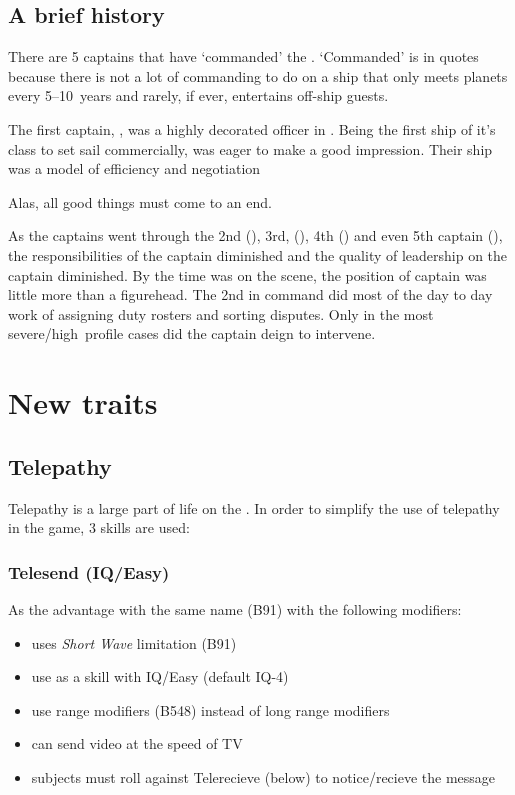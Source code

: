 \documentclass[a4paper,twocolumn]{memoir}
\begin{document}
\section{A brief history}
\label{sec:brief-history}

There are 5 captains that have `commanded' the \aventis. `Commanded' is in quotes because there is not a lot of commanding to do on a ship that only meets planets every 5--10~years and rarely, if ever, entertains off-ship guests.

The first captain, \captainone, was a highly decorated officer in \thecompany. Being the first ship of it's class to set sail commercially, \captainone was eager to make a good impression. Their ship was a model of efficiency and negotiation

Alas, all good things must come to an end.

As the captains went through the 2nd (\captaintwo), 3rd, (\captainthree), 4th (\captainfour) and even 5th captain (\captainfive), the responsibilities of the captain diminished and the quality of leadership on the captain diminished. By the time \captainfive was on the scene, the position of captain was little more than a figurehead. The 2nd in command did most of the day to day work of assigning duty rosters and sorting disputes. Only in the most severe/high~profile cases did the captain deign to intervene.



\chapter{New traits}
\label{cha:new-traits}

\section{Telepathy}
\label{sec:telepathy}

Telepathy is a large part of life on the \aventis. In order to simplify the use
of telepathy in the game, 3 skills are used:

\subsection{Telesend (IQ/Easy)}
\label{sec:telesend-iqeasy}

As the advantage with the same name (B91) with the following modifiers:
\begin{itemize}
\item uses \emph{Short Wave} limitation (B91)
\item use as a skill with IQ/Easy (default IQ-4)
\item use range modifiers (B548) instead of long range modifiers
\item can send video at the speed of TV
\item subjects must roll against Telerecieve (below) to notice/recieve the message
\end{itemize}
\end{document}
